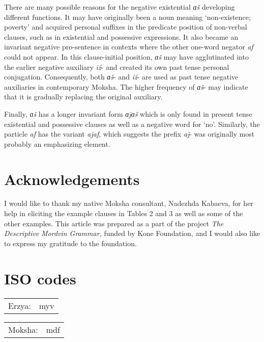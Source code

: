 \documentclass[output=paper,colorlinks,citecolor=brown,draft,draftmode]{langscibook}
\begin{document}
  There are many possible reasons for the negative existential \textit{ɑš} developing different functions. It may have originally been a noun meaning `non-existence; poverty' and acquired personal suffixes in the predicate position of non-verbal clauses, such as in existential and possessive expressions. It also became an invariant negative pro-sentence in contexts where the other one-word negator \textit{af} could not appear. In this clause-initial position, \textit{ɑš} may have agglutinated into the earlier negative auxiliary \textit{iź}- and created its own past tense personal conjugation. Consequently, both \textit{ɑš}- and \textit{iź}- are used as past tense negative auxiliaries in contemporary Moksha. The higher frequency of \textit{ɑš}- may indicate that it is gradually replacing the original auxiliary.

  Finally, \textit{ɑš} has a longer invariant form \textit{ɑjɑš} which is only found in present tense existential and possessive clauses as well as a negative word for `no'. Similarly, the particle \textit{af} has the variant \textit{ajaf}, which suggests the prefix \textit{aj}- was originally most probably an emphasizing element.

\nocite{Moksha1998-1,PaasonenRavila1947}
{\sloppy
\printbibliography[heading=subbibliography,notkeyword=this,category=sources,title={Sources}]
}

\section*{Acknowledgements}
I would like to thank my native Moksha consultant, Nadezhda Kabaeva, for her help in eliciting the example clauses in Tables 2 and 3 as well as some of the other examples. This article was prepared as a part of the project \textit{The} \textit{Descriptive} \textit{Mordvin} \textit{Grammar,} funded by Kone Foundation, and I would also like to express my gratitude to the foundation.

\section*{ISO codes}
\begin{tabularx}{.5\textwidth}[t]{@{}lQ}
Erzya: &myv\\
\end{tabularx}%
\begin{tabularx}{.5\textwidth}[t]{lQ@{}}
Moksha:& mdf\\
\end{tabularx}
\end{document}
